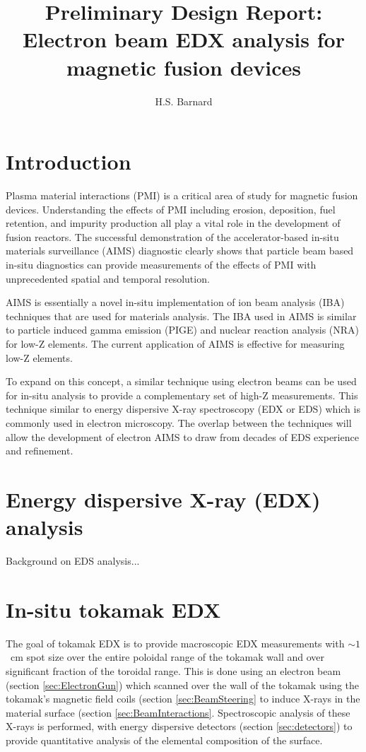 \documentclass[12pt,letterpaper,final]{article}
\author{H.S. Barnard}
\title{Preliminary Design Report: Electron beam EDX analysis for magnetic fusion devices}
\begin{document}
\maketitle

\section{Introduction}

Plasma material interactions (PMI) is a critical area of study for magnetic fusion devices.  Understanding the effects of PMI including erosion, deposition, fuel retention, and impurity production all play a vital role in the development of fusion reactors. The successful demonstration of the accelerator-based in-situ materials surveillance (AIMS) diagnostic clearly shows that particle beam based in-situ diagnostics can provide measurements of the effects of PMI with unprecedented spatial and temporal resolution.

AIMS is essentially a novel in-situ implementation of ion beam analysis (IBA) techniques that are used for materials analysis. The IBA used in AIMS is similar to particle induced gamma emission (PIGE) and nuclear reaction analysis (NRA) for low-Z elements. The current application of AIMS is effective for measuring low-Z elements.

To expand on this concept, a similar technique using electron beams can be used for in-situ analysis to provide a complementary set of high-Z measurements. This technique similar to energy dispersive X-ray spectroscopy (EDX or EDS) which is commonly used in electron microscopy. The overlap between the techniques will allow the development of electron AIMS to draw from decades of EDS experience and refinement.

\section{Energy dispersive X-ray (EDX) analysis}

Background on EDS analysis...

\section{In-situ tokamak EDX}

The goal of tokamak EDX is to provide macroscopic EDX measurements with $\sim1$~cm spot size over the entire poloidal range of the tokamak wall and over significant fraction of the toroidal range. This is done using an electron beam (section \ref{sec:ElectronGun}) which scanned over the wall of the tokamak using the tokamak's magnetic field coils (section \ref{sec:BeamSteering} to induce X-rays in the material surface (section \ref{sec:BeamInteractions}. Spectroscopic analysis of these X-rays is performed, with energy dispersive detectors (section \ref{sec:detectors}) to provide quantitative analysis of the elemental composition of the surface. 
\end{document}

